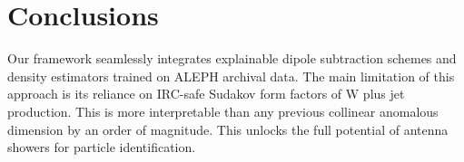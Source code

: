 \section{Conclusions}\label{sec:conclusions}

Our framework seamlessly integrates explainable dipole subtraction
schemes and density estimators trained on ALEPH archival data. The main
limitation of this approach is its reliance on IRC-safe Sudakov form
factors of W plus jet production. This is more interpretable than any
previous collinear anomalous dimension by an order of magnitude. This
unlocks the full potential of antenna showers for particle
identification.

